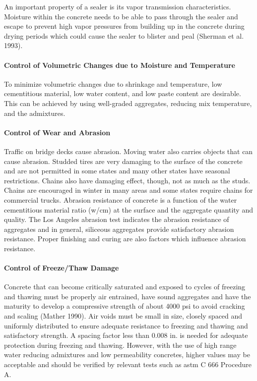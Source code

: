 An important property of a sealer is its vapor transmission characteristics. Moisture within the concrete needs to be able to pass through the sealer and escape to prevent high vapor pressures from building up in the concrete during drying periods which could cause the sealer to blister and peal (Sherman et al. 1993).

\paragraph{Control of Volumetric Changes due to Moisture and Temperature}
To minimize volumetric changes due to shrinkage and temperature, low cementitious material, low water content, and low paste content are desirable. This can be achieved by using well-graded aggregates, reducing mix temperature, and the admixtures.


\paragraph{Control of Wear and Abrasion}
Traffic on bridge decks cause abrasion. Moving water also carries objects that can cause abrasion. Studded tires are very damaging to the surface of the concrete and are not permitted in some states and many other states have seasonal restrictions. Chains also have damaging effect, though, not as much as the studs. Chains are encouraged in winter in many areas and some states require chains for commercial trucks. Abrasion resistance of concrete is a function of the water cementitious material ratio (w/cm) at the surface and the aggregate quantity and quality. The Los Angeles abrasion test indicates the abrasion resistance of aggregates and in general, siliceous aggregates provide satisfactory abrasion resistance. Proper finishing and curing are also factors which influence abrasion resistance.



\paragraph{Control of Freeze/Thaw Damage}
Concrete that can become critically saturated and exposed to cycles of freezing and thawing must be properly air entrained, have sound aggregates and have the maturity to develop a compressive strength of about 4000 psi to avoid cracking and scaling (Mather 1990). Air voids must be small in size, closely spaced and uniformly distributed to ensure adequate resistance to freezing and thawing and satisfactory strength. A spacing factor less than 0.008 in. is needed for adequate protection during freezing and thawing. However, with the use of high range water reducing admixtures and low permeability concretes, higher values may be acceptable and should be verified by relevant tests such as \acrshort*{astm} C 666 Procedure A.

